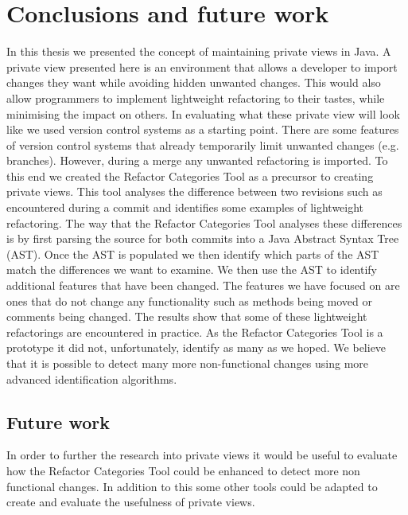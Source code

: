
\chapter{Conclusions and future work}\label{C:con}

In this thesis we presented the concept of maintaining private views in Java.
A private view presented here is an environment that allows a developer to import changes they want while avoiding hidden unwanted changes. 
This would also allow programmers to implement lightweight refactoring to their tastes, while minimising the impact on others.  
In evaluating what these private view will look like we used version control systems as a starting point.
There are some features of version control systems that already temporarily limit unwanted changes (e.g. branches).
However, during a merge any unwanted refactoring is imported. 
To this end we created the Refactor Categories Tool as a precursor to creating private views. 
This tool analyses the difference between two revisions such as encountered during a commit and identifies some examples of lightweight refactoring.
The way that the Refactor Categories Tool analyses these differences is by first parsing the source for both commits into a Java Abstract Syntax Tree (AST).
Once the AST is populated we then identify which parts of the AST match the differences we want to examine.
We then use the AST to identify additional features that have been changed. 
The features we have focused on are ones that do not change any functionality such as methods being moved or comments being changed. 
The results show that some of these lightweight refactorings are encountered in practice.
As the Refactor Categories Tool is a prototype it did not, unfortunately, identify as many as we hoped.
We believe that it is possible to detect many more non-functional changes using more advanced identification algorithms.

\section{Future work}

In order to further the research into private views it would be useful to evaluate how the Refactor Categories Tool could be enhanced to detect more non functional changes. 
In addition to this some other tools could be adapted to create and evaluate the usefulness of private views.  

